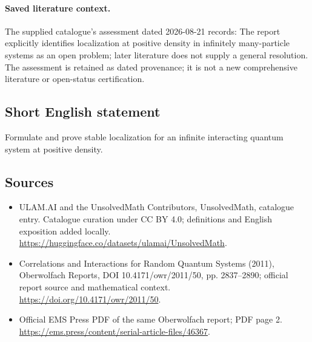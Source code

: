 \documentclass[11pt]{article}
\begin{document}
\paragraph{Saved literature context.} The supplied catalogue's assessment dated 2026-08-21 records: The report explicitly identifies localization at positive density in infinitely many-particle systems as an open problem; later literature does not supply a general resolution. The assessment is retained as dated provenance; it is not a new comprehensive literature or open-status certification.
\subsection{Short English statement}
Formulate and prove stable localization for an infinite interacting quantum system at positive density.
\subsection{Sources}
\begin{itemize}
\item[\hypertarget{source:statement:1}{S1}] ULAM.AI and the UnsolvedMath Contributors, UnsolvedMath, catalogue entry. Catalogue curation under CC BY 4.0; definitions and English exposition added locally.
\url{https://huggingface.co/datasets/ulamai/UnsolvedMath}.
\item[\hypertarget{source:statement:2}{S2}] Correlations and Interactions for Random Quantum Systems (2011), Oberwolfach Reports, DOI 10.4171/owr/2011/50, pp. 2837--2890; official report source and mathematical context.
\url{https://doi.org/10.4171/owr/2011/50}.
\item[\hypertarget{source:statement:3}{S3}] Official EMS Press PDF of the same Oberwolfach report; PDF page 2.
\url{https://ems.press/content/serial-article-files/46367}.
\end{itemize}
\label{end:statement}
\end{document}

